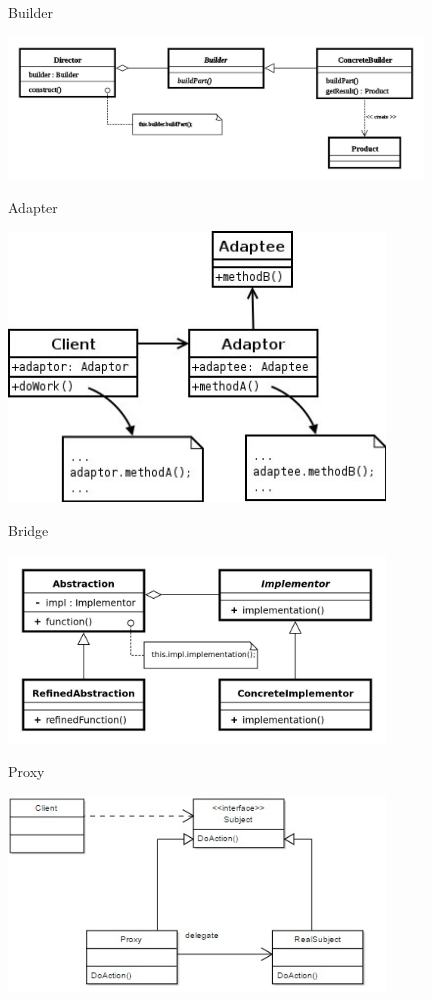 \begin{frame}{Builder}
	\begin{center}
		\includegraphics[width=11cm]{pattern_builder.jpg}
	\end{center}
\end{frame}

\begin{frame}{Adapter}
	\begin{center}
		\includegraphics[width=10cm]{pattern_adapter.jpg}
	\end{center}
\end{frame}

\begin{frame}{Bridge}
	\begin{center}
		\includegraphics[width=10cm]{pattern_bridge.jpg}
	\end{center}
\end{frame}

\begin{frame}{Proxy}
	\begin{center}
		\includegraphics[width=10cm]{pattern_proxy.jpg}
	\end{center}
\end{frame}

